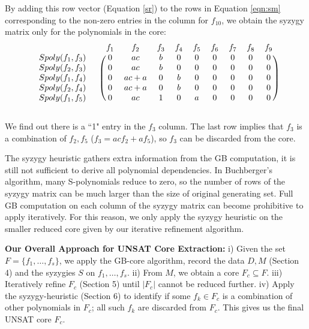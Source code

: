 \begin{Example}
 By adding this row vector (Equation \ref{sr}) to the rows in
 Equation \ref{eqn:sm} corresponding to the non-zero entries in the
 column for $f_{10}$, we obtain the syzygy matrix only for the
 polynomials in the core:
  \[
 \begin{blockarray}{ccccccccccc}
  && f_1 & f_2 & f_3 & f_4 & f_5 & f_6 & f_7 & f_8 & f_9  \\
  \begin{block}{cc(ccccccccc)}
  Spoly(f_1,f_3)\ & & 0 & ac & b &0&0&0&0&0&0\\
  Spoly(f_2,f_3)\  && 0 & ac & b &0&0&0&0&0&0\\
  Spoly(f_1,f_4)\  && 0 & ac+a & 0 &b&0&0&0&0&0\\
  Spoly(f_2,f_4)\  && 0 & ac+a & 0 &b&0&0&0&0&0\\
  Spoly(f_1,f_5)\  && 0 & ac & 1 &0&a&0&0&0&0\\
  \end{block}
  \end{blockarray}
 \]

 We find out there is a ``1" entry in the $f_3$ column. The last row
 implies that $f_3$ is a combination of $f_2, f_5$ ($f_3 = ac f_2 + a
 f_5$), so $f_3$ can be discarded from the core. 

 \end{Example}

The syzygy heuristic gathers extra information from the GB
computation, it is still not sufficient to derive all polynomial
dependencies. In Buchberger's algorithm,  many S-polynomials reduce to
zero, so the number of rows of the syzygy matrix can be much larger than
the size of original generating set. Full GB computation on each
column of the syzygy matrix can become prohibitive to apply
iteratively. For this reason, we only apply the syzygy heuristic
on the smaller reduced core given by our iterative refinement algorithm.

\textbf{Our Overall Approach for UNSAT Core Extraction:} i) Given
the set $F = \{f_1,\dots,f_s\}$, we apply the GB-core algorithm,
record the data $D, M$ (Section 4) and the syzygies $S$ on
$f_1,\dots,f_s$. ii) From $M$, we obtain a core $F_c \subseteq
F$. iii) Iteratively refine $F_c$ (Section 5) until $|F_c|$ cannot be
reduced further. iv) Apply the syzygy-heuristic (Section 6) to
identify if some $f_k \in F_c$ is a combination of other polynomials
in $F_c$; all such $f_k$ are discarded from $F_c$. This gives us the
final UNSAT core $F_c$. 

